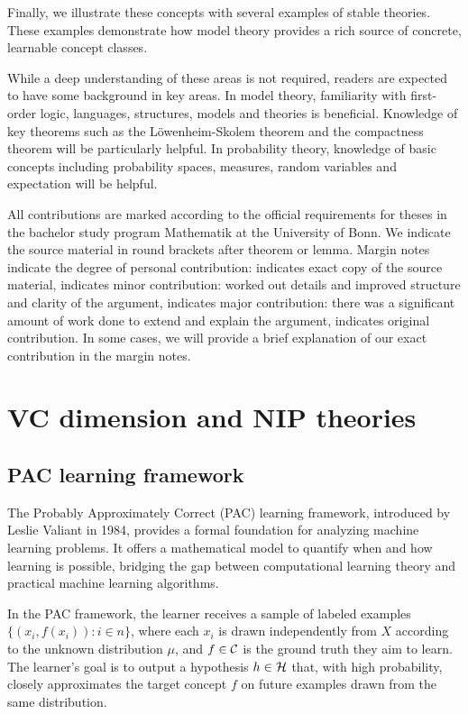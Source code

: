 \begin{outline}
\0 Finally, we illustrate these concepts with several examples of stable theories. These examples demonstrate how model theory provides a rich source of concrete, learnable concept classes.

\0 While a deep understanding of these areas is not required, readers are expected to have some background in key areas. In model theory, familiarity with first-order logic, languages, structures, models and theories is beneficial. Knowledge of key theorems such as the Löwenheim-Skolem theorem and the compactness theorem will be particularly helpful. In probability theory, knowledge of basic concepts including probability spaces, measures, random variables and expectation will be helpful. 

\0 All contributions are marked according to the official requirements for theses in the bachelor study program Mathematik at the University of Bonn. We indicate the source material in round brackets after theorem or lemma. Margin notes indicate the degree of personal contribution:
     indicates exact copy of the source material,
     indicates minor contribution: worked out details and improved structure and clarity of the argument,
     indicates major contribution: there was a significant amount of work done to extend and explain the argument,
     indicates original contribution.
\0 In some cases, we will provide a brief explanation of our exact contribution in the margin notes.
\end{outline}

\newpage 

\section{VC dimension and NIP theories}

\subsection{PAC learning framework}

The Probably Approximately Correct (PAC) learning framework, introduced by Leslie Valiant in 1984, provides a formal foundation for analyzing machine learning problems. It offers a mathematical model to quantify when and how learning is possible, bridging the gap between computational learning theory and practical machine learning algorithms.

In the PAC framework, the learner receives a sample of labeled examples $\{(x_i,f(x_i)) : i\in n\}$, where each $x_i$ is drawn independently from $X$ according to the unknown distribution $\mu$, and $f \in \mathcal{C}$ is the ground truth they aim to learn. The learner's goal is to output a hypothesis $h\in\mathcal{H}$ that, with high probability, closely approximates the target concept $f$ on future examples drawn from the same distribution. 

